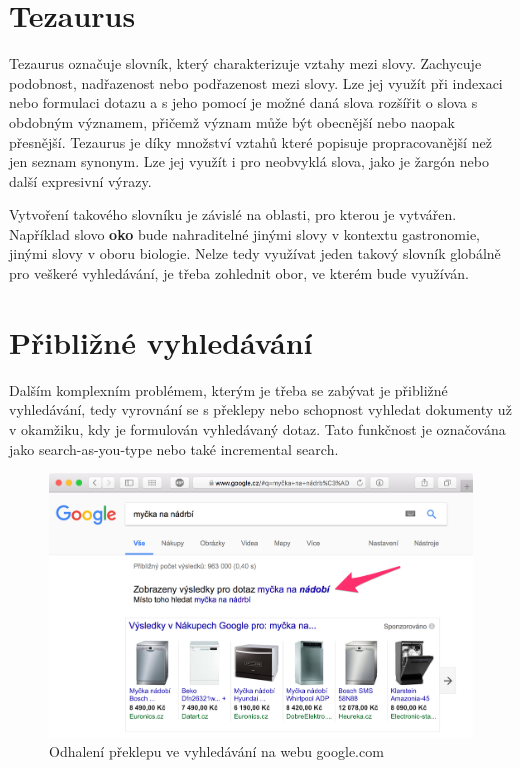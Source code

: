 \documentclass[FM,DP]{tulthesis}
\begin{document}
\section{Tezaurus}

Tezaurus označuje slovník, který charakterizuje vztahy mezi slovy. Zachycuje podobnost, 
nadřazenost nebo podřazenost mezi slovy. Lze jej využít při indexaci nebo formulaci 
dotazu a s jeho pomocí je možné daná slova rozšířit o slova s obdobným významem, 
přičemž význam může být obecnější nebo naopak přesnější. Tezaurus je díky množství
vztahů které popisuje propracovanější než jen seznam synonym. Lze jej využít 
i pro neobvyklá slova, jako je žargón nebo další expresivní výrazy.

Vytvoření takového slovníku je závislé na oblasti, pro kterou je vytvářen. Například 
slovo \textbf{oko} bude nahraditelné jinými slovy v kontextu gastronomie, jinými 
slovy v oboru biologie. Nelze tedy využívat jeden takový slovník globálně pro
veškeré vyhledávání, je třeba zohlednit obor, ve kterém bude využíván.

\section{Přibližné vyhledávání}

Dalším komplexním problémem, kterým je třeba se zabývat je přibližné vyhledávání, tedy
vyrovnání se s překlepy nebo schopnost vyhledat dokumenty už v okamžiku, kdy je formulován
vyhledávaný dotaz. Tato funkčnost je označována jako search-as-you-type nebo také
incremental search.

\begin{figure}[h]
\center
\includegraphics[width=\textwidth]{google-preklep.png}
\caption{Odhalení překlepu ve vyhledávání na webu google.com}
\label{google-preklep}
\end{figure}
\end{document}
